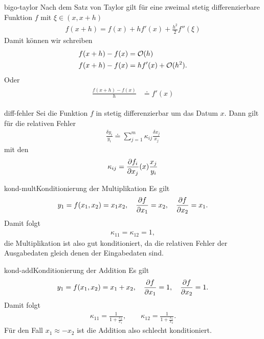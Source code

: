\begin{Beispiel}{bigo-taylor}
  Nach dem Satz von Taylor gilt für eine zweimal stetig
  differenzierbare Funktion $f$ mit $\xi\in(x,x+h)$
  \begin{gather}
 f(x+h) = f(x) + h f'(x) + \tfrac{h^2}{2} f''(\xi)   
\end{gather}
Damit können wir schreiben
\begin{gather}
  \begin{split}
    f(x+h)-f(x) &= \mathcal O(h)\\
    f(x+h)-f(x) &=  h f'(x) + \mathcal O(h^2).
  \end{split}
\end{gather}
Oder
\begin{gather}
  \begin{split}
    \frac{f(x+h)-f(x)}h &\doteq f'(x)
  \end{split}
\end{gather}
\end{Beispiel}

\begin{Lemma}{diff-fehler}
  Sei die Funktion $f$ in  stetig
  differenzierbar um das Datum $x$. Dann gilt für die relativen Fehler
  \begin{gather*}
    \frac{\delta y_i}{y_i}
    \doteq \sum_{j=1}^m \kappa_{ij}\frac{\delta x_j}{x_j}
  \end{gather*}
  mit den 
  \begin{gather}
    \kappa_{ij} = \frac{\partial f_i}{\partial x_j}(x)
    \frac{x_j}{y_i}
  \end{gather}
\end{Lemma}

\begin{Beispiel*}{kond-mult}{Konditionierung der Multiplikation}
  Es gilt
  \begin{gather}
    y_1 = f(x_1,x_2) = x_1 x_2,
    \quad \frac{\partial f}{\partial x_1} = x_2,
    \quad \frac{\partial f}{\partial x_2} = x_1.
  \end{gather}
  Damit folgt
  \begin{gather}
    \kappa_{11} = \kappa_{12} = 1,
  \end{gather}
  die Multiplikation ist also gut konditioniert, da die relativen
  Fehler der Ausgabedaten gleich denen der Eingabedaten sind.
\end{Beispiel*}

\begin{Beispiel*}{kond-add}{Konditionierung der Addition}
  Es gilt
  \begin{gather}
    y_1 = f(x_1,x_2) = x_1 + x_2,
    \quad \frac{\partial f}{\partial x_1} = 1,
    \quad \frac{\partial f}{\partial x_2} = 1.
  \end{gather}
  Damit folgt
  \begin{gather}
    \kappa_{11} = \frac{1}{1+\frac{x_2}{x_1}},
    \qquad\kappa_{12} = \frac{1}{1+\frac{x_1}{x_2}}.
  \end{gather}
  Für den Fall $x_1 \approx -x_2$ ist die Addition also schlecht konditioniert.
\end{Beispiel*}

